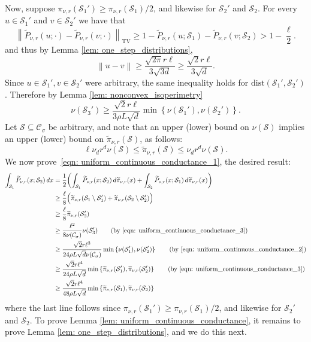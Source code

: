 \documentclass[11pt,twoside]{article}
\newcommand{\set}[1]{\left\{#1\right\}}
\newcommand{\norm}[1]{\left\lVert#1\right\rVert}
\newcommand{\1}{\mathbf{1}}
\newcommand{\Sset}{\mathcal{S}}
\newcommand{\Cset}{\mathcal{C}}
\newcommand{\Csig}{\Cset_{\sigma}}
\newcommand{\dx}{\,dx}
\begin{document}
Now, suppose $\pi_{\nu,r}(\Sset_1') \geq \pi_{\nu,r}(\Sset_1)/2$, and likewise for $\Sset_2'$ and $\Sset_2$. For every $u \in \Sset_1'$ and $v \in \Sset_2'$ we have that
\begin{equation*}
\norm{\widetilde{P}_{\nu,r}(u;\cdot) - \widetilde{P}_{\nu,r}(v;\cdot)}_{\mathrm{TV}} \geq 1 - \widetilde{P}_{\nu,r}(u;\Sset_1) - \widetilde{P}_{\nu,r}(v;\Sset_2) > 1 - \frac{\ell}{2}.
\end{equation*}
and thus by Lemma \ref{lem: one_step_distributions},
\begin{equation*}
\norm{u - v} \geq \frac{\sqrt{2 \pi } r \ell}{3 \sqrt{3 d}} \geq \frac{\sqrt{2}r \ell}{3\sqrt{d}}.
\end{equation*}
Since $u \in \Sset_1', v \in \Sset_2'$ were arbitrary, the same inequality holds for $\mathrm{dist}(\Sset_1', \Sset_2')$. Therefore by Lemma \ref{lem: nonconvex_isoperimetry}
\begin{equation}
\label{eqn: uniform_continuous_conductance_2}
\nu(\Sset_3') \geq  \frac{\sqrt{2} r \ell}{3 \rho L \sqrt{d}} \min \set{\nu(\Sset_1'), \nu(\Sset_2')}.
\end{equation}
Let $\Sset \subseteq \Csig$ be arbitrary, and note that an upper (lower) bound on $\nu(\Sset)$ implies an upper (lower) bound on $\widetilde{\pi}_{\nu,r}(\Sset)$, as follows:
\begin{equation}
\label{eqn: uniform_continuous_conductance_3}
\ell \nu_d r^d \nu(\Sset) \leq \widetilde{\pi}_{\nu,r}(\Sset) \leq \nu_d r^d \nu(\Sset).
\end{equation}
We now prove~\eqref{eqn: uniform_continuous_conductance_1}, the desired result:
\begin{align*}
\int_{\Sset_1} \widetilde{P}_{\nu,r}(x; \Sset_2) \dx & = \frac{1}{2} \biggl(\int_{\Sset_1} \widetilde{P}_{\nu,r}(x; \Sset_2)  \,d\widetilde{\pi}_{\nu,r}(x) + \int_{\Sset_2} \widetilde{P}_{\nu,r}(x; \Sset_1) \,d\widetilde{\pi}_{\nu,r}(x)\biggr) \\
& \geq \frac{\ell}{8} \Bigl( \widetilde{\pi}_{\nu,r}(\Sset_1 \setminus \Sset_1') + \widetilde{\pi}_{\nu,r}(\Sset_2 \setminus \Sset_2') \Bigr) \\
& \geq \frac{\ell}{8} \widetilde{\pi}_{\nu,r}(\Sset_3') \\
& \geq \frac{\ell^2}{8 \nu(\Csig)} \nu(\Sset_3') \tag{by \eqref{eqn: uniform_continuous_conductance_3}}\\
& \geq \frac{\sqrt{2} r \ell^3}{24 \rho L \sqrt{d} \nu(\Csig)} \min \set{\nu(\Sset_1'), \nu(\Sset_2')} \tag{by \eqref{eqn: uniform_continuous_conductance_2}}\\
& \geq \frac{\sqrt{2} r \ell^4}{24 \rho L \sqrt{d}} \min \set {\widetilde{\pi}_{\nu,r}(\Sset_1'), \widetilde{\pi}_{\nu,r}(\Sset_2')} \tag{by \eqref{eqn: uniform_continuous_conductance_3}}\\
& \geq \frac{\sqrt{2} r \ell^4}{48 \rho L \sqrt{d}} \min \set {\widetilde{\pi}_{\nu,r}(\Sset_1), \widetilde{\pi}_{\nu,r}(\Sset_2)}
\end{align*}
where the last line follows since $\pi_{\nu,r}(\Sset_1') \geq \pi_{\nu,r}(\Sset_1)/2$, and likewise for $\Sset_2'$ and $\Sset_2$. To prove Lemma \ref{lem: uniform_continuous_conductance}, it remains to prove Lemma \ref{lem: one_step_distributions}, and we do this next.
\end{document}

